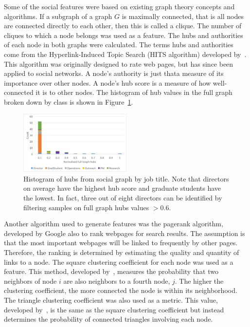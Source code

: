 \documentclass{article}
\begin{document}
Some of the social features were based on existing graph theory concepts and algorithms. If a subgraph of a graph $G$ is maximally connected, that is all nodes are connected directly to each other, then this is called a clique.  The number of cliques to which a node belongs was used as a feature.  The hubs and authorities of each node in both graphs were calculated.  The terms hubs and authorities come from the Hyperlink-Induced Topic Search (HITS algorithm) developed by~\cite{kleinberg_hubs_1999}.  This algorithm was originally designed to rate web pages, but has since been applied to social networks. A node's authority is just that\textemdash{}a measure of its importance over other nodes.  A node's hub score is a measure of how well-connected it is to other nodes.  The histogram of hub values in the full graph broken down by class is shown in Figure~\ref{fig:social_ex_hist}.  
\begin{figure}[H]
    \centering
        \includegraphics[width=0.5\textwidth]{Hubs_hist}
        \caption{Histogram of hubs from social graph by job title.  Note that directors on average have the highest hub score and graduate students have the lowest.  In fact, three out of eight directors can be identified by filtering samples on full graph hubs values $>0.6$. }
        \label{fig:social_ex_hist}
\end{figure}

Another algorithm used to generate features was the pagerank algorithm, developed by Google 
\cite{page_pagerank_1999} also to rank webpages for search results.  The assumption is that the most important webpages will be linked to frequently by other pages.  Therefore, the ranking is determined by estimating the quality and quantity of links to a node.  The square clustering coefficient for each node was used as a feature.  This method, developed by~\cite{lind_cycles_2005}, measures the probability that two neighbors of node $i$ are also neighbors to a fourth node, $j$.  The higher the clustering coefficient, the more connected the node is within its neighborhood.  The triangle clustering coefficient was also used as a metric.  This value, developed by~\cite{saramaki_generalizations_2007}, is the same as the square clustering coefficient but instead determines the probability of connected triangles involving each node.
\end{document}
